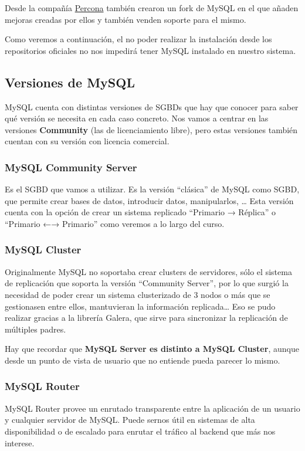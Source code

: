 Desde la compañía \href{https://www.percona.com/}{Percona} también crearon un fork de MySQL en el que añaden mejoras creadas por ellos y también venden soporte para el mismo.

Como veremos a continuación, el no poder realizar la instalación desde los repositorios oficiales no nos impedirá tener MySQL instalado en nuestro sistema.


\subsection{Versiones de MySQL}
MySQL cuenta con distintas versiones de SGBDs que hay que conocer para saber qué versión se necesita en cada caso concreto. Nos vamos a centrar en las versiones \textbf{Community} (las de licenciamiento libre), pero estas versiones también cuentan con su versión con licencia comercial.

\subsubsection{MySQL Community Server}
Es el SGBD que vamos a utilizar. Es la versión “clásica” de MySQL como SGBD, que permite crear bases de datos, introducir datos, manipularlos, … Esta versión cuenta con la opción de crear un sistema replicado “Primario → Réplica” o “Primario ←→ Primario” como veremos a lo largo del curso.

\subsubsection{MySQL Cluster}
Originalmente MySQL no soportaba crear clusters de servidores, sólo el sistema de replicación que soporta la versión “Community Server”, por lo que surgió la necesidad de poder crear un sistema clusterizado de 3 nodos o más que se gestionasen entre ellos, mantuvieran la información replicada… Eso se pudo realizar gracias a la librería Galera, que sirve para sincronizar la replicación de múltiples padres.

Hay que recordar que \textbf{MySQL Server es distinto a MySQL Cluster}, aunque desde un punto de vista de usuario que no entiende pueda parecer lo mismo.

\subsubsection{MySQL Router}
MySQL Router provee un enrutado transparente entre la aplicación de un usuario y cualquier servidor de MySQL. Puede sernos útil en sistemas de alta disponibilidad o de escalado para enrutar el tráfico al backend que más nos interese.

